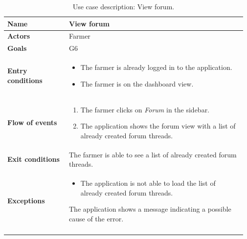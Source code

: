 \begin{longtable}{@{}p{0.25\linewidth} p{0.72\linewidth}@{}}
    \toprule
	\textbf{Name}               & View forum\\
	\midrule
	\textbf{Actors}             & Farmer\\
	\midrule
	\textbf{Goals}              & G6 \\
	\midrule
	
	\textbf{Entry conditions}   & \begin{itemize}[leftmargin=.4cm,noitemsep,topsep=0pt,before=\vspace{-3mm},after=\vspace{-4mm}]
	    \item The farmer is already logged in to the application.
	    \item The farmer is on the dashboard view.
	\end{itemize}\\
	\midrule
	
	\textbf{Flow of events}     & \begin{enumerate}[leftmargin=.4cm,noitemsep,topsep=0pt,before=\vspace{-3mm},after=\vspace{-4mm}]
	    \item The farmer clicks on \textit{Forum} in the sidebar.
	    \item The application shows the forum view with a list of already created forum threads.
	\end{enumerate}\\
	\midrule
	\textbf{Exit conditions}    & The farmer is able to see a list of already created forum threads. \\
	\midrule
	
	\textbf{Exceptions}         & 
    \begin{itemize}[leftmargin=.4cm,noitemsep,topsep=0pt,before=\vspace{-3mm}]
	   \item The application is not able to load the list of already created forum threads.
	\end{itemize}
	The application shows a message indicating a possible cause of the error.
	\\\bottomrule
	\caption{Use case description: View forum.} 
\end{longtable}

